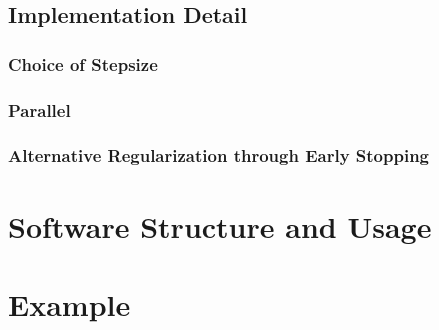 \documentclass[tablecaption=bottom,wcp]{jmlr} %
\begin{document}
\subsection{Implementation Detail}
\subsubsection{Choice of Stepsize}
\citet{micchelli-convex-2005}

\subsubsection{Parallel}

\subsubsection{Alternative Regularization through Early Stopping}


\section{Software Structure and Usage}

\section{Example}
\end{document}
